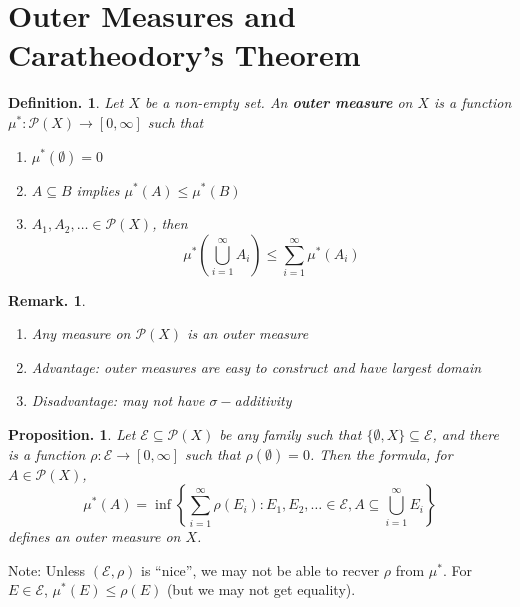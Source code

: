 \documentclass[11pt, a4paper]{memoir}
\theoremstyle{change}
\newtheorem{proposition}[theorem]{Proposition.}
\theoremstyle{plain}
\theoremstyle{nonumberplain}
\newtheorem{definition}{Definition.}
\newtheorem{remark}{Remark.}
\begin{document}
\section{Outer Measures and Caratheodory's Theorem}
\begin{definition}
    Let $X$ be a non-empty set.
    An \textbf{outer measure} on $X$ is a function $\mu^*:\mathcal{P}(X)\to[0,\infty]$ such that
    \begin{enumerate}[nolistsep,label=(\roman*)]
        \item $\mu^*(\emptyset)=0$
        \item $A\subseteq B$ implies $\mu^*(A)\leq\mu^*(B)$
        \item $A_1,A_2,\ldots\in \mathcal{P}(X)$, then
            \begin{equation*}\mu^*\left(\bigcup\limits_{i=1}^\infty A_i\right)\leq\sum\limits_{i=1}^\infty \mu^*(A_i)\end{equation*}
    \end{enumerate}
\end{definition}
\begin{remark}
    \begin{enumerate}[nolistsep,label=(\alph*)]
        \item Any measure on $\mathcal{P}(X)$ is an outer measure
        \item Advantage: outer measures are easy to construct and have largest domain
        \item Disadvantage: may not have $\sigma-$additivity
    \end{enumerate}
\end{remark}
\begin{proposition}
    Let $\mathcal{E}\subseteq\mathcal{P}(X)$ be any family such that $\{\emptyset,X\}\subseteq\mathcal{E}$, and there is a function $\rho:\mathcal{E}\to[0,\infty]$ such that $\rho(\emptyset)=0$.
    Then the formula, for $A\in\mathcal{P}(X)$,
    \begin{equation*}
        \mu^*(A)=\inf\left\{\sum\limits_{i=1}^\infty \rho(E_i):E_1,E_2,\ldots\in\mathcal{E}, A\subseteq\bigcup\limits_{i=1}^\infty E_i\right\}
    \end{equation*}
    defines an outer measure on $X$.
\end{proposition}
Note: Unless $(\mathcal{E},\rho)$ is ``nice'', we may not be able to recver $\rho$ from $\mu^*$.
For $E\in\mathcal{E}$, $\mu^*(E)\leq\rho(E)$ (but we may not get equality).
\end{document}
